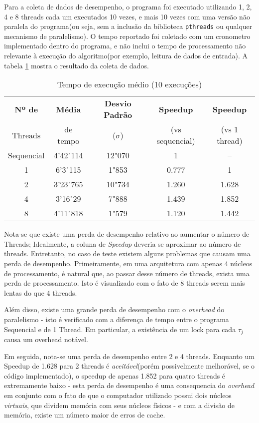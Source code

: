 Para a coleta de dados de desempenho, o programa foi executado utilizando 1, 2, 4 e 8 threads cada um executados 10 vezes, e mais 10 vezes com uma versão não paralela do programa(ou seja, sem a inclusão da biblioteca \texttt{pthreads} ou qualquer mecanismo de paralelismo). O tempo reportado foi coletado com um cronometro implementado dentro do programa, e não inclui o tempo de processamento não relevante à execução do algoritmo(por exemplo, leitura de dados de entrada). A tabela \ref{tab:tempos} mostra o resultado da coleta de dados.

\begin{table} [ht]
	\centering
	\caption{Tempo de execução médio (10 execuções)}
	\label{tab:tempos}
	\begin{tabular}{|c|c|c|c|c|}
		\hline
		\textbf{Nº de } & {\bf Média } & 
		{\bf Desvio Padrão} & {\bf Speedup}& \textbf{Speedup}\\
		Threads & de tempo & ($\sigma$) & (vs sequencial) & (vs 1 thread)\\
		\hline
		Sequencial & 4'42"114 & 12"070 & 1 & --\\
		\hline
		1 & 6'3"115 & 1"853 & 0.777 & 1 \\
		\hline
		2 & 3'23"765 & 10"734 & 1.260 & 1.628 \\
		\hline
		4 & 3'16"29 & 7"888 & 1.439 & 1.852 \\
		\hline
		8 & 4'11"818 & 1"579 & 1.120 & 1.442\\
		\hline
	\end{tabular}
\end{table}

Nota-se que existe uma perda de desempenho relativo ao aumentar o número de Threads; Idealmente, a coluna de \textit{Speedup} deveria se aproximar ao número de threads. Entretanto, no caso de teste existem alguns problemas que causam uma perda de desempenho. Primeiramente, em uma arquitetura com apenas 4 núcleos de processamento, é natural que, ao passar desse número de threads, exista uma perda de processamento. Isto é visualizado com o fato de 8 threads serem mais lentas do que 4 threads.

Além disso, existe uma grande perda de desempenho com o \textit{overhead} do paralelismo - isto é verificado com a diferença de tempo entre o programa Sequencial e de 1 Thread. Em particular, a existência de um lock para cada $\tau_j$ causa um overhead notável.

Em seguida, nota-se uma perda de desempenho entre 2 e 4 threads. Enquanto um Speedup de 1.628 para 2 threads é \textit{aceitável}(porém possivelmente melhorável, se o código implementado), o speedup de apenas 1.852 para quatro threads é extremamente baixo - esta perda de desempenho é uma consequencia do \textit{overhead} em conjunto com o fato de que o computador utilizado possui dois núcleos \textit{virtuais}, que dividem memória com seus núcleos físicos - e com a divisão de memória, existe um número maior de erros de cache.

